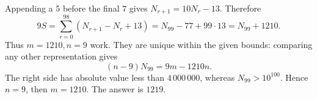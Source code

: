 Appending a $5$ before the final $7$ gives $N_{r+1}=10N_r-13$. Therefore
\[
9S=\sum_{r=0}^{98}(N_{r+1}-N_r+13)
=N_{99}-77+99\cdot13=N_{99}+1210.
\]
Thus $m=1210,n=9$ work. They are unique within the given bounds: comparing any other representation gives
\[
(n-9)N_{99}=9m-1210n.
\]
The right side has absolute value less than $4\,000\,000$, whereas $N_{99}>10^{100}$. Hence $n=9$, then $m=1210$. The answer is $\boxed{1219}$.

